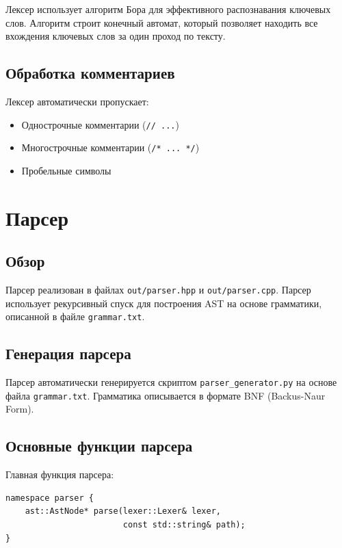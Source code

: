 \documentclass[12pt,a4paper]{article}
\begin{document}
Лексер использует алгоритм Бора для эффективного распознавания ключевых слов. Алгоритм строит конечный автомат, который позволяет находить все вхождения ключевых слов за один проход по тексту.

\subsection{Обработка комментариев}

Лексер автоматически пропускает:
\begin{itemize}
    \item Однострочные комментарии (\texttt{// ...})
    \item Многострочные комментарии (\texttt{/* ... */})
    \item Пробельные символы
\end{itemize}

\section{Парсер}

\subsection{Обзор}

Парсер реализован в файлах \texttt{out/parser.hpp} и \texttt{out/parser.cpp}. Парсер использует рекурсивный спуск для построения AST на основе грамматики, описанной в файле \texttt{grammar.txt}.

\subsection{Генерация парсера}

Парсер автоматически генерируется скриптом \texttt{parser\_generator.py} на основе файла \texttt{grammar.txt}. Грамматика описывается в формате BNF (Backus-Naur Form).

\subsection{Основные функции парсера}

Главная функция парсера:

\begin{lstlisting}
namespace parser {
    ast::AstNode* parse(lexer::Lexer& lexer, 
                        const std::string& path);
}
\end{lstlisting}
\end{document}
